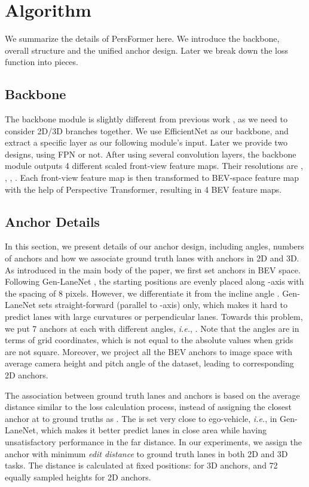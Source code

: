 \documentclass[runningheads]{llncs}
\begin{document}
\section{Algorithm}\label{sec: sup - alg}
We summarize the details of PersFormer here. We introduce the backbone, overall structure and the unified anchor design. Later we break down the loss function into pieces.
\subsection{Backbone}
The backbone module is slightly different from previous work \cite{Garnett_2019_ICCV,guo2020gen}, as we need to consider 2D/3D branches together.
We use EfficientNet \cite{tan2019efficientnet} as our backbone, and extract a specific layer as our following module's input. 
Later we provide two designs, using FPN \cite{lin2017fpn} or not.
After using several convolution layers, the backbone module outputs 4 different scaled front-view feature maps.
Their resolutions are , , , .
Each front-view feature map is then transformed to BEV-space feature map with the help of Perspective Transformer, resulting in 4 BEV feature maps.







\subsection{Anchor Details}

In this section, we present details of our anchor design, including angles, numbers of anchors and how we associate ground truth lanes with anchors in 2D and 3D.
As introduced in the main body of the paper, we first set anchors in BEV space.
Following Gen-LaneNet \cite{guo2020gen}, the starting positions  are evenly placed along -axis with the spacing of 8 pixels.
However, we differentiate it from the incline angle . Gen-LaneNet sets straight-forward (parallel to -axis) only, which makes it hard to predict lanes with large curvatures or perpendicular lanes.
Towards this problem, we put 7 anchors at each  with different angles, \textit{i.e.}, . Note that the angles are in terms of grid coordinates, which is not equal to the absolute values when grids are not square.
Moreover, we project all the BEV anchors to image space with average camera height and pitch angle of the dataset, leading to corresponding 2D anchors.

The association between ground truth lanes and anchors is based on the average distance similar to the loss calculation process, instead of assigning the closest anchor at  to ground truths as \cite{Garnett_2019_ICCV,guo2020gen}.
The  is set very close to ego-vehicle, \textit{i.e.},  in Gen-LaneNet, which makes it better predict lanes in close area while having unsatisfactory performance in the far distance.
In our experiments, we assign the anchor with minimum \textit{edit distance} to ground truth lanes in both 2D and 3D tasks.
The distance is calculated at fixed  positions:  for 3D anchors, and 72 equally sampled heights for 2D anchors.
\end{document}
